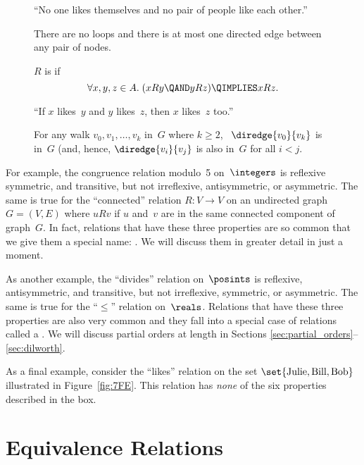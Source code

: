 \begin{figure}[p]
{\begin{description}
``No one likes themselves and no pair of people like each other.''

There are no loops and there is at most one directed edge between any
pair of nodes.

\item[Transitivity]

$R$ is  if
\begin{equation*}
    \forall x, y, z \in A. \; (x R y \QAND y R z) \QIMPLIES x R z.
\end{equation*}

``If $x$ likes~$y$ and $y$ likes~$z$, then $x$ likes~$z$ too.''

For any walk $v_0, v_1, \dots, v_k$ in~$G$ where $k \ge 2$,
\ $\diredge{v_0}{v_k}$ is in~$G$ (and, hence, $\diredge{v_i}{v_j}$ is
also in~$G$ for all $i < j$.

\end{description}}

\end{figure}

For example, the congruence relation modulo~5 on~$\integers$ is
reflexive symmetric, and transitive, but not irreflexive,
antisymmetric, or asymmetric.  The same is true for the ``connected''
relation $R: V \to V$ on an undirected graph $G = (V, E)$ where $u R
v$ if $u$ and~$v$ are in the same connected component of graph~$G$.
In fact, relations that have these three properties are so common that
we give them a special name: .  We will
discuss them in greater detail in just a moment.

As another example, the ``divides'' relation on~$\posints$ is
reflexive, antisymmetric, and transitive, but not irreflexive,
symmetric, or asymmetric.  The same is true for the ``$\le$'' relation
on~$\reals$.  Relations that have these three properties are also very
common and they fall into a special case of relations called a
.  We will discuss partial orders at length in
Sections \ref{sec:partial_orders}--\ref{sec:dilworth}.

As a final example, consider the ``likes'' relation on the set $\set{
  \text{Julie}, \text{Bill}, \text{Bob} }$ illustrated in
Figure~\ref{fig:7FE}.  This relation has \emph{none} of the six
properties described in the box.

\section{Equivalence Relations}

